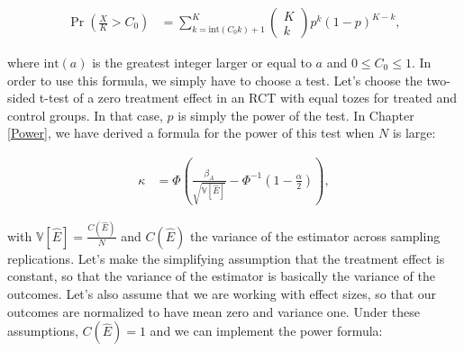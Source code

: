 \documentclass[]{book}
\newcommand{\var}[1]{\mathbb{V}[ #1 ]}
\theoremstyle{definition}
\theoremstyle{definition}
\theoremstyle{definition}
\theoremstyle{remark}
\begin{document}
\begin{align*}
  \Pr(\frac{X}{K}>C_0) & = \sum_{k=\text{int}(C_{0}k)+1}^{K}\left(\begin{array}{c}K\\k\end{array}\right)p^k(1-p)^{K-k},
\end{align*}

where \(\text{int}(a)\) is the greatest integer larger or equal to \(a\) and \(0\leq C_0\leq 1\).
In order to use this formula, we simply have to choose a test.
Let's choose the two-sided t-test of a zero treatment effect in an RCT with equal tozes for treated and control groups.
In that case, \(p\) is simply the power of the test.
In Chapter \ref{Power}, we have derived a formula for the power of this test when \(N\) is large:

\begin{align*}
  \kappa & = \Phi\left(\frac{\beta_A}{\sqrt{\var{\hat{E}}}}-\Phi^{-1}\left(1-\frac{\alpha}{2}\right)\right),
\end{align*}

with \(\var{\hat{E}}=\frac{C(\hat{E})}{N}\) and \(C(\hat{E})\) the variance of the estimator across sampling replications.
Let's make the simplifying assumption that the treatment effect is constant, so that the variance of the estimator is basically the variance of the outcomes.
Let's also assume that we are working with effect sizes, so that our outcomes are normalized to have mean zero and variance one.
Under these assumptions, \(C(\hat{E})=1\) and we can implement the power formula:
\end{document}
